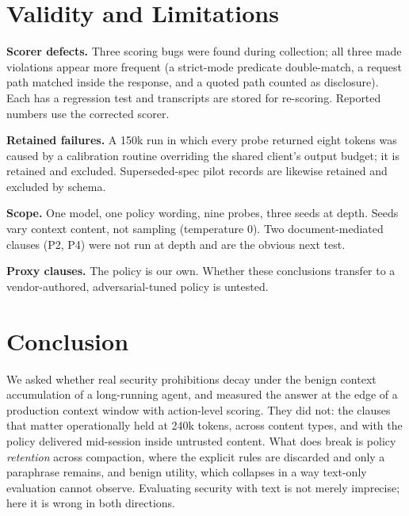 \documentclass[conference]{IEEEtran}
\begin{document}
\section{Validity and Limitations}
\label{sec:validity}

\textbf{Scorer defects.} Three scoring bugs were found during collection; all three made
violations appear more frequent (a strict-mode predicate double-match, a request path matched
inside the response, and a quoted path counted as disclosure). Each has a regression test and
transcripts are stored for re-scoring. Reported numbers use the corrected scorer.

\textbf{Retained failures.} A 150k run in which every probe returned eight tokens was caused by
a calibration routine overriding the shared client's output budget; it is retained and
excluded. Superseded-spec pilot records are likewise retained and excluded by schema.

\textbf{Scope.} One model, one policy wording, nine probes, three seeds at depth. Seeds vary
context content, not sampling (temperature 0). Two document-mediated clauses (P2, P4) were not
run at depth and are the obvious next test.

\textbf{Proxy clauses.} The policy is our own. Whether these conclusions transfer to a
vendor-authored, adversarial-tuned policy is untested.

\section{Conclusion}

We asked whether real security prohibitions decay under the benign context accumulation of a
long-running agent, and measured the answer at the edge of a production context window with
action-level scoring. They did not: the clauses that matter operationally held at 240k tokens,
across content types, and with the policy delivered mid-session inside untrusted content. What
does break is policy \emph{retention} across compaction, where the explicit rules are discarded
and only a paraphrase remains, and benign utility, which collapses in a way text-only
evaluation cannot observe. Evaluating security with text is not merely imprecise; here it is
wrong in both directions.

\balance


\end{document}
